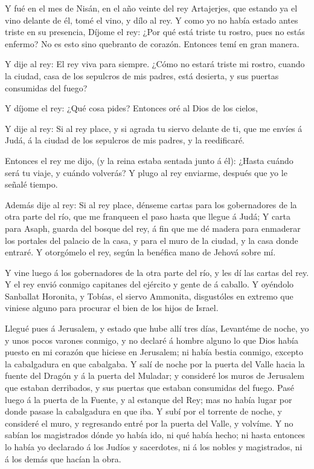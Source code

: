  Y fué en el mes de Nisán, en el año veinte del rey
Artajerjes, que estando ya el vino delante de él, tomé el vino, y dílo
al rey. Y como yo no había estado antes triste en su presencia,
 Díjome el rey: ¿Por qué está triste tu rostro, pues no
estás enfermo? No es esto sino quebranto de corazón. Entonces temí en
gran manera.

 Y dije al rey: El rey viva para siempre. ¿Cómo no estará
triste mi rostro, cuando la ciudad, casa de los sepulcros de mis padres,
está desierta, y sus puertas consumidas del fuego?

 Y díjome el rey: ¿Qué cosa pides? Entonces oré al Dios de
los cielos,

 Y dije al rey: Si al rey place, y si agrada tu siervo
delante de ti, que me envíes á Judá, á la ciudad de los sepulcros de mis
padres, y la reedificaré.

 Entonces el rey me dijo, (y la reina estaba sentada junto á
él): ¿Hasta cuándo será tu viaje, y cuándo volverás? Y plugo al rey
enviarme, después que yo le señalé tiempo.

 Además dije al rey: Si al rey place, dénseme cartas para
los gobernadores de la otra parte del río, que me franqueen el paso
hasta que llegue á Judá;  Y carta para Asaph, guarda del
bosque del rey, á fin que me dé madera para enmaderar los portales del
palacio de la casa, y para el muro de la ciudad, y la casa donde
entraré. Y otorgómelo el rey, según la benéfica mano de Jehová sobre mí.

 Y vine luego á los gobernadores de la otra parte del río, y
les dí las cartas del rey. Y el rey envió conmigo capitanes del ejército
y gente de á caballo.  Y oyéndolo Sanballat Horonita, y
Tobías, el siervo Ammonita, disgustóles en extremo que viniese alguno
para procurar el bien de los hijos de Israel.

 Llegué pues á Jerusalem, y estado que hube allí tres días,
 Levantéme de noche, yo y unos pocos varones conmigo, y no
declaré á hombre alguno lo que Dios había puesto en mi corazón que
hiciese en Jerusalem; ni había bestia conmigo, excepto la cabalgadura en
que cabalgaba.  Y salí de noche por la puerta del Valle
hacia la fuente del Dragón y á la puerta del Muladar; y consideré los
muros de Jerusalem que estaban derribados, y sus puertas que estaban
consumidas del fuego.  Pasé luego á la puerta de la Fuente,
y al estanque del Rey; mas no había lugar por donde pasase la
cabalgadura en que iba.  Y subí por el torrente de noche, y
consideré el muro, y regresando entré por la puerta del Valle, y
volvíme.  Y no sabían los magistrados dónde yo había ido,
ni qué había hecho; ni hasta entonces lo había yo declarado á los Judíos
y sacerdotes, ni á los nobles y magistrados, ni á los demás que hacían
la obra.

